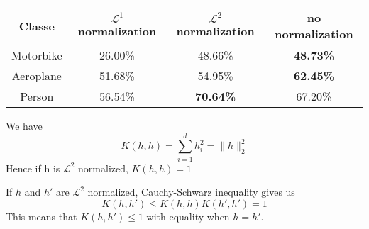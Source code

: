 \documentclass{article}
\begin{document}
\begin{table}[h!]
  \centering
  \begin{tabular}{| c | c | c | c |}
    \hline
    Classe & $\mathcal{L}^1$ normalization & $\mathcal{L}^2$ normalization & no normalization \\
    \hline
    Motorbike & 26.00\% & 48.66\% & \textbf{48.73\%} \\
    Aeroplane & 51.68\% & 54.95\% & \textbf{62.45\%} \\
    Person    & 56.54\% & \textbf{70.64\%} & 67.20\% \\
    \hline
  \end{tabular}
   \label{tab:ap-normalization}
\end{table}



We have
\begin{equation*}
  K(h, h) = \sum_{i = 1}^d h_i^2 = \| h \|_2^2
\end{equation*}
Hence if h is $\mathcal{L}^2$ normalized, $K(h, h) = 1$

If $h$ and $h'$ are $\mathcal{L}^2$ normalized, Cauchy-Schwarz
inequality gives us
\begin{equation*}
  K(h, h') \le K(h, h) K(h', h') = 1
\end{equation*}
This means that $K(h, h') \le 1$ with equality when $h = h'$.
\end{document}
